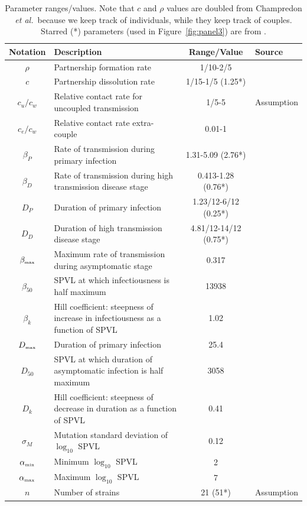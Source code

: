 \documentclass[10pt,letterpaper]{article}
\newcommand{\tsub}[2]{#1_{{\textrm{\tiny #2}}}}
\newcommand{\etal}{\textit{et al.}}
\newcommand{\tsub}[2]{#1_{{\textrm{\tiny #2}}}}
\begin{document}
\begin{table}[h!]
\caption{Parameter ranges/values.  Note that $c$ and $\rho$ values are doubled from Champredon \etal\  because we keep track of individuals, while they keep track of couples. Starred (*) parameters (used in Figure~\ref{fig:panel3}) are from \cite{shirreff_transmission_2011}.}
\centering
\begin{tabular}{c p{2in} c l}
\hline 
Notation & Description & Range/Value & Source\\
\hline %
$\rho$ & Partnership formation rate & 1/10-2/5 & \cite{champredon_hiv_2013} \\
$c$ & Partnership dissolution rate & 1/15-1/5 (1.25*) & \cite{champredon_hiv_2013} \\
$c_u/c_w$ & Relative contact rate for uncoupled transmission & 1/5-5 & Assumption \\
$c_e/c_w$ & Relative contact rate extra-couple & 0.01-1 & \cite{champredon_hiv_2013} \\
$\beta_P$ & Rate of transmission during primary infection & 1.31-5.09 (2.76*) & \cite{hollingsworth_hiv1_2008} \\
$\beta_D$ & Rate of transmission during high transmission disease stage & 0.413-1.28 (0.76*) & \cite{hollingsworth_hiv1_2008} \\
$D_P$ & Duration of primary infection & 1.23/12-6/12 (0.25*) & \cite{hollingsworth_hiv1_2008,shirreff_transmission_2011} \\
$D_D$ & Duration of high transmission disease stage & 4.81/12-14/12 (0.75*) & \cite{hollingsworth_hiv1_2008} \\
$\tsub{\beta}{max}$ & Maximum rate of transmission during asymptomatic stage & 0.317 & \cite{shirreff_transmission_2011} \\
$\beta_{50}$ & SPVL at which infectiousness is half maximum & 13938 & \cite{shirreff_transmission_2011} \\
$\beta_k$ & Hill coefficient: steepness of increase in infectiousness as a function of SPVL & 1.02 & \cite{shirreff_transmission_2011} \\
$\tsub{D}{max}$ & Duration of primary infection & 25.4 & \cite{shirreff_transmission_2011} \\
$D_{50}$ & SPVL at which duration of asymptomatic infection is half maximum & 3058 & \cite{shirreff_transmission_2011} \\
$D_{k}$ & Hill coefficient: steepness of decrease in duration as a function of SPVL & 0.41 & \cite{shirreff_transmission_2011} \\
$\sigma_M$ & Mutation standard deviation of $\log_{10}$ SPVL & 0.12 & \cite{shirreff_transmission_2011} \\
$\tsub{\alpha}{min}$ & Minimum $\log_{10}$ SPVL & 2 & \cite{shirreff_transmission_2011}\\
$\tsub{\alpha}{max}$ & Maximum $\log_{10}$ SPVL & 7 & \cite{shirreff_transmission_2011}\\
$n$ & Number of strains & 21 (51*) & Assumption\\
\hline
\end{tabular}
\label{table:parmsTable}
\end{table}
\end{document}
